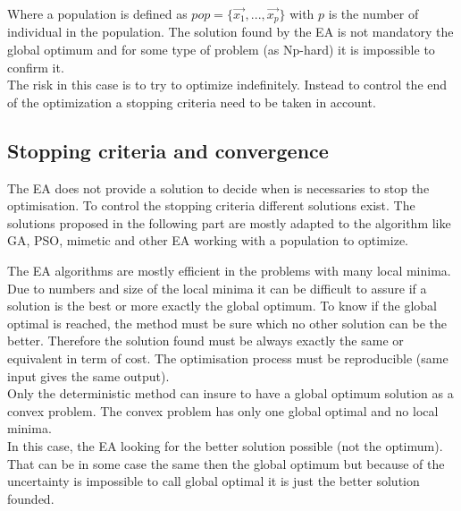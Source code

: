 Where  a population is defined as $pop=\{\vec{x_1}, ...,\vec{x_p}  \}$ with $p$ is the number of individual in the population. 
The solution found by the EA is not mandatory the global optimum and for some type of problem (as Np-hard) it is impossible to confirm it. \\
The risk in this case is to try to optimize indefinitely. Instead to control the end of the optimization a stopping criteria  need to be taken in account.

\subsection{Stopping criteria and convergence}
 
The EA does not provide a solution to decide when is necessaries to stop the optimisation. 
To control the stopping criteria different solutions exist. The solutions proposed in the following part are mostly adapted to the algorithm like GA, PSO, mimetic and other EA working with a population to optimize.


The EA algorithms are mostly efficient in the problems with many local minima. Due to numbers and size of the local minima it can be difficult to assure if a solution is the best or more exactly the global optimum. 
To know if the global optimal is reached, the method must be sure which no other solution can be the better. Therefore the solution found must be always exactly the same or equivalent in term of cost. The optimisation process must be reproducible (same input gives the same output).\\
 Only the deterministic method can insure to have a global optimum solution as a convex problem. The convex problem has only one global optimal and no local minima. \\%
  In this case, the EA looking for the better solution possible (not the optimum). That can be in some case the same then the global optimum but because of the uncertainty is impossible to call global optimal it is just the better solution founded.  
 
